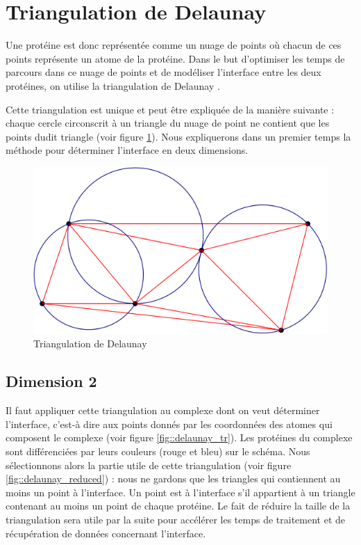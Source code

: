 \section{Triangulation de Delaunay}

Une protéine est donc représentée comme un nuage de points où chacun de ces points
représente un atome de la protéine. Dans le but d'optimiser les temps de parcours dans
ce nuage de points et de modéliser l'interface entre les deux protéines,
 on utilise la triangulation de Delaunay \cite{Triangulation}.

 Cette triangulation est unique et peut être expliquée de la manière suivante :
 chaque cercle circonscrit à un triangle du nuage de point ne contient que les points
 dudit triangle (voir figure \ref{fig::explication_delaunay}).
 Nous expliquerons dans un premier
 temps la méthode pour déterminer l'interface en deux dimensions.

\begin{figure}[ht]
\centering
  \includegraphics[width=\textwidth]{figures/explication_delaunay.png}
  \caption{Triangulation de Delaunay}
  \label{fig::explication_delaunay}
\end{figure}

\subsection*{Dimension 2}

Il faut appliquer cette triangulation au complexe dont on veut déterminer l'interface, c'est-à dire
aux points donnés par les coordonnées des atomes qui composent le complexe
(voir figure \ref{fig::delaunay_tr}). Les protéines du complexe sont différenciées
par leurs couleurs (rouge et bleu) sur le schéma. Nous sélectionnons alors la partie utile de
cette triangulation (voir figure \ref{fig::delaunay_reduced}) : nous ne gardons que
les triangles qui contiennent au moins un point à l'interface.
Un point est à l'interface s'il appartient à un triangle contenant au moins un point
de chaque protéine. Le fait de réduire la taille de la triangulation sera utile par la suite
pour accélérer les temps de traitement et de récupération de données concernant l'interface.



